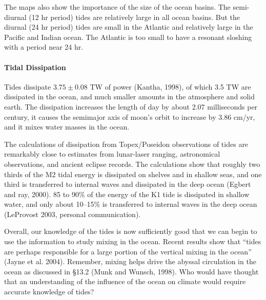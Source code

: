 The maps also show the importance of the size of the ocean basins. The
semi-diurnal (12 hr period) tides are
relatively large in all ocean basins. But the
diurnal (24 hr period) tides are small in the
Atlantic and relatively large in the Pacific and Indian ocean. The
Atlantic is too small to have a resonant sloshing with a period near
24 hr.

\paragraph{Tidal Dissipation}
Tides dissipate $3.75\pm0.08$ TW of power
(Kantha, 1998), of which 3.5 TW are dissipated in the ocean, and much
smaller amounts in the atmosphere and solid earth. The dissipation
increases the length of day by about 2.07 milliseconds per century, it
causes the semimajor axis of moon's orbit to increase by 3.86 cm/yr,
and it mixes water masses in the ocean.

The calculations of dissipation from
Topex/Poseidon
observations of tides are remarkably close to estimates from
lunar-laser ranging, astronomical observations, and ancient eclipse
records. The calculations show that roughly two thirds of the M2 tidal
energy is dissipated on shelves and in shallow seas, and one third is
transferred to internal waves and dissipated in the deep ocean (Egbert
and ray, 2000). 85 to 90\% of the energy of the K1 tide is dissipated
in shallow water, and only about 10--15\% is transferred to internal
waves in the deep ocean (LeProvost 2003, personal communication).

Overall, our knowledge of the tides is now sufficiently good that we
can begin to use the information to study mixing
in the ocean. Recent results show that ``tides are perhaps responsible
for a large portion of the vertical mixing in the ocean'' (Jayne et
al. 2004). Remember, mixing helps drive the abyssal
circulation in the ocean as discussed in \S 13.2 (Munk and
Wunsch, 1998). Who would have thought that an understanding of the
influence of the ocean on climate would require accurate knowledge of
tides?

